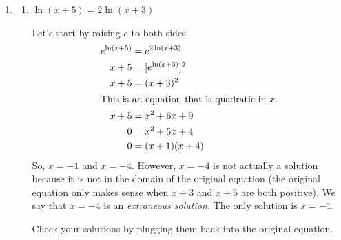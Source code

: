 \documentclass{article}
\providecommand{\check}{}
\renewcommand{\check}{\ifmmode{\text{ \ding{51} }}\else{\ding{51} }\fi}
\begin{document}
\begin{enumerate}[resume]
\item  \label{equations-with-multiple-logs}

  \begin{enumerate}
  \item


    \begin{problem}[\vfill]
      $\ln(x + 5) = 2 \ln (x + 3)$
    \end{problem}

    \begin{solution}
      Let's start by raising $e$ to both sides:
      \begin{align*}
        e^{\ln (x + 5)} &= e^{2 \ln(x + 3)} \\
        x + 5 &= [e^{\ln (x + 3)}]^2 \\
        x + 5 &= (x + 3)^2 \\
        \intertext{This is an equation that is quadratic in $x$.}
        x + 5 &= x^2 + 6x + 9 \\
        0 &= x^2 + 5x + 4 \\
        0 &= (x + 1)(x + 4) 
      \end{align*}
      So, $x = -1$ and $x = -4$. However, $x = -4$ is not actually a solution because it is not in the domain of the original equation (the original equation only makes sense when $x + 3$ and $x + 5$ are both positive). We say that $x=-4$ is an \textit{extraneous
      solution.} The only solution is $x = \boxed{-1}$.
    \end{solution}


    \begin{problem}[\stretch{0.35}]
      \check Check your solutions by plugging them back into the original equation. 
    \end{problem}

  \end{enumerate}


\end{enumerate}
\end{document}
